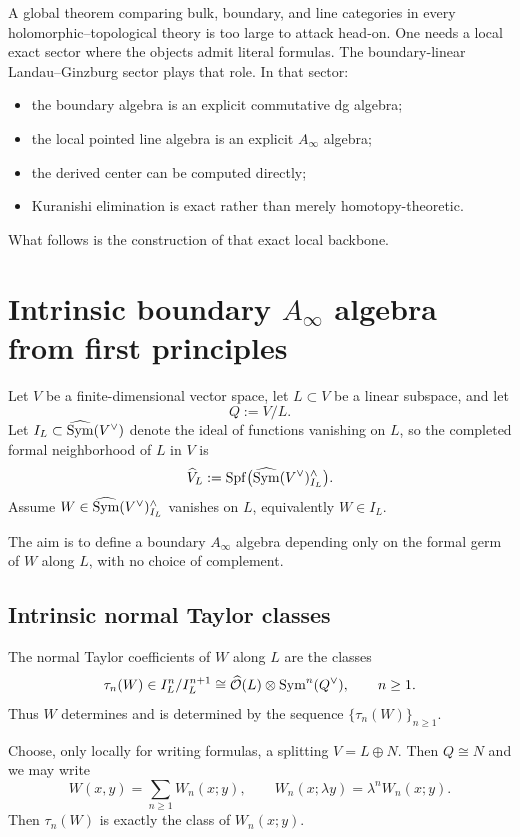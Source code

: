 A global theorem comparing bulk, boundary, and line categories in every holomorphic--topological theory is too large to attack head-on. One needs a local exact sector where the objects admit literal formulas. The boundary-linear Landau--Ginzburg sector plays that role. In that sector:
\begin{itemize}[leftmargin=1.8em]
\item the boundary algebra is an explicit commutative dg algebra;
\item the local pointed line algebra is an explicit $A_\infty$ algebra;
\item the derived center can be computed directly;
\item Kuranishi elimination is exact rather than merely homotopy-theoretic.
\end{itemize}
What follows is the construction of that exact local backbone.


\section{Intrinsic boundary $A_\infty$ algebra from first principles}%

Let $V$ be a finite-dimensional vector space, let $L\subset V$ be a linear subspace, and let
\[
Q:=V/L.
\]
Let $I_L\subset \widehat{\operatorname{Sym}}(V^\vee)$ denote the ideal of functions vanishing on $L$, so the completed formal neighborhood of $L$ in $V$ is
\[
\widehat{V}_L:=\operatorname{Spf}\bigl(\widehat{\operatorname{Sym}}(V^\vee)^\wedge_{I_L}\bigr).
\]
Assume $W\in \widehat{\operatorname{Sym}}(V^\vee)^\wedge_{I_L}$ vanishes on $L$, equivalently $W\in I_L$.

The aim is to define a boundary $A_\infty$ algebra depending only on the formal germ of $W$ along $L$, with no choice of complement.

\subsection{Intrinsic normal Taylor classes}

The normal Taylor coefficients of $W$ along $L$ are the classes
\[
\tau_n(W)\in I_L^n/I_L^{n+1}\cong \widehat{\mathcal O}(L)\otimes \operatorname{Sym}^n(Q^\vee),
\qquad n\ge 1.
\]
Thus $W$ determines and is determined by the sequence $\{\tau_n(W)\}_{n\ge 1}$.

Choose, only locally for writing formulas, a splitting $V=L\oplus N$. Then $Q\cong N$ and we may write
\[
W(x,y)=\sum_{n\ge 1} W_n(x;y),
\qquad
W_n(x;\lambda y)=\lambda^n W_n(x;y).
\]
Then $\tau_n(W)$ is exactly the class of $W_n(x;y)$.

